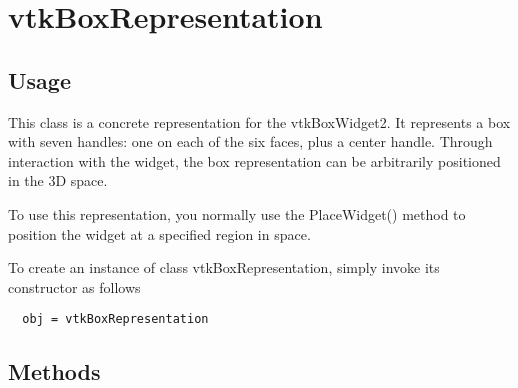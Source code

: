 \section{vtkBoxRepresentation}

\subsection{Usage}

 This class is a concrete representation for the vtkBoxWidget2. It
 represents a box with seven handles: one on each of the six faces, plus a
 center handle. Through interaction with the widget, the box
 representation can be arbitrarily positioned in the 3D space.

 To use this representation, you normally use the PlaceWidget() method
 to position the widget at a specified region in space.


To create an instance of class vtkBoxRepresentation, simply
invoke its constructor as follows
\begin{verbatim}
  obj = vtkBoxRepresentation
\end{verbatim}
\subsection{Methods}

